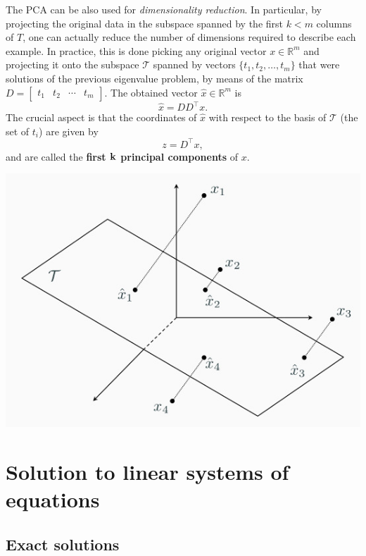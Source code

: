 \documentclass[10pt]{report}
\begin{document}
The PCA can be also used for \emph{dimensionality reduction}. In particular, by projecting the original data in the subspace spanned by the first \(k < m\) columns of \(T\), one can actually reduce the number of dimensions required to describe each example. In practice, this is done picking any original vector \(x \in \mathbb{R}^m\) and projecting it onto the subspace \(\mathcal T\) spanned by vectors \(\{t_1, t_2, \dots, t_m\}\) that were solutions of the previous eigenvalue problem, by means of the matrix \(D = \begin{bmatrix}t_1 & t_2& \cdots & t_m\end{bmatrix}\). The obtained vector \(\hat x \in \mathbb{R}^m\) is \[\hat x = DD^\top x.\] The crucial aspect is that the coordinates of \(\hat x\) with respect to the basis of \(\mathcal T\) (the set of \(t_i\)) are given by $$z = D^\top x,$$ and are called the \textbf{first \(\bf k\) principal components} of \(x\).

\begin{center}
\includegraphics[scale=0.3]{./pics/alg/pca3.jpg}
\end{center}
\chapter{Solution to linear systems of equations}
\label{sec:org108c897}
\section{Exact solutions}
\label{sec:orgdaa8e2f}
\end{document}
